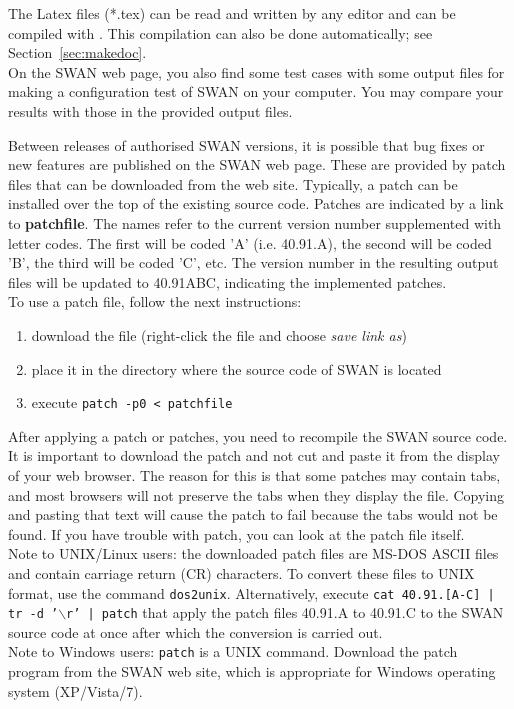 \documentclass[12pt]{book}
\begin{document}
\noindent
The Latex files (*.tex) can be read and written by any editor and can be compiled with \LaTeXe.
This compilation can also be done automatically; see Section~\ref{sec:makedoc}.
\\[2ex]
\noindent
On the SWAN web page, you also find some test cases with some output files for making a
configuration test of SWAN on your computer. You may compare your results with those in
the provided output files.

 \label{ch:patch}

Between releases of authorised SWAN versions, it is possible that bug fixes or new
features are published on the SWAN web page. These are provided by patch files that can
be downloaded from the web site. Typically, a patch can be installed over the top of the
existing source code. Patches are indicated by a link to {\bf patchfile}. The names
refer to the current version number supplemented with letter codes. The first will be
coded 'A' (i.e. 40.91.A), the second will be coded 'B', the third will be coded 'C', etc.
The version number in the resulting output files will be updated to 40.91ABC, indicating
the implemented patches.
\\[2ex]
\noindent
To use a patch file, follow the next instructions:
\begin{enumerate}
  \item download the file (right-click the file and choose {\it save link as})
  \item place it in the directory where the source code of SWAN is located
  \item execute {\tt patch -p0 < patchfile}
\end{enumerate}
After applying a patch or patches, you need to recompile the SWAN source code.
\\[2ex]
\noindent
It is important to download the patch and not cut and paste it from the display
of your web browser. The reason for this is that some patches may contain tabs,
and most browsers will not preserve the tabs when they display the file. Copying
and pasting that text will cause the patch to fail because the tabs would not be
found. If you have trouble with patch, you can look at the patch file itself.
\\[2ex]
\noindent
Note to UNIX/Linux users:
the downloaded patch files are MS-DOS ASCII files and contain carriage return (CR) characters.
To convert these files to  UNIX format, use the command {\tt dos2unix}. Alternatively,
execute {\tt cat 40.91.[A-C] | tr -d '$\backslash$r' | patch} that apply the patch files
40.91.A to 40.91.C to the SWAN source code at once after which the conversion is
carried out.
\\[2ex]
\noindent
Note to Windows users: {\tt patch} is a UNIX command. Download the patch program
from the SWAN web site, which is appropriate for Windows operating system (XP/Vista/7).
\end{document}

